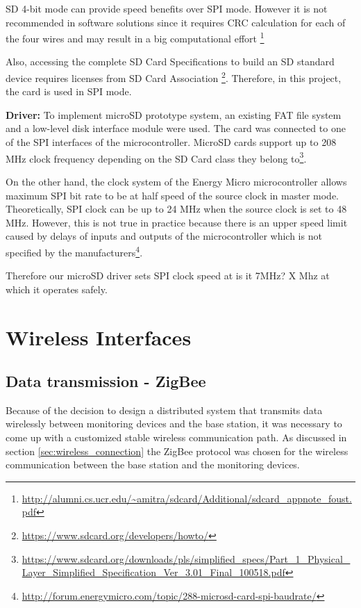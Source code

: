 SD 4-bit mode can provide speed benefits over SPI mode. However it is not recommended in software solutions since it requires CRC calculation for each of the four wires and may result in a big computational effort \footnote{\url{http://alumni.cs.ucr.edu/~amitra/sdcard/Additional/sdcard_appnote_foust.pdf}}

Also, accessing the complete SD Card Specifications to build an SD standard device requires licenses from SD Card Association \footnote{\url{https://www.sdcard.org/developers/howto/}}. Therefore, in this project, the card is used in SPI mode. 

\textbf{Driver:}
To implement microSD prototype system, an existing FAT file system and a low-level disk interface module were used. The card was connected to one of the SPI interfaces of the microcontroller. MicroSD cards support up to 208 MHz clock frequency depending on the SD Card class they belong to\footnote{\url{https://www.sdcard.org/downloads/pls/simplified_specs/Part_1_Physical_Layer_Simplified_Specification_Ver_3.01_Final_100518.pdf}}. 

On the other hand, the clock system of the Energy Micro microcontroller allows maximum SPI bit rate to be at half speed of the source clock in master mode. Theoretically, SPI clock can be up to 24 MHz when the source clock is set to 48 MHz. However, this is not true in practice because there is an upper speed limit caused by delays of inputs and outputs of the microcontroller which is not specified by the manufacturers\footnote{\url{http://forum.energymicro.com/topic/288-microsd-card-spi-baudrate/}}. 

Therefore our microSD driver sets SPI clock speed at \TODO{:}is it 7MHz? X Mhz at which it operates safely.   


\section{Wireless Interfaces}
\subsection{Data transmission - ZigBee}
Because of the decision to design a distributed system that transmits data wirelessly between monitoring devices and the base station, it was necessary to come up with a customized stable wireless communication path. As discussed in section \ref{sec:wireless_connection} the ZigBee protocol was chosen for the wireless communication between the base station and the monitoring devices.


